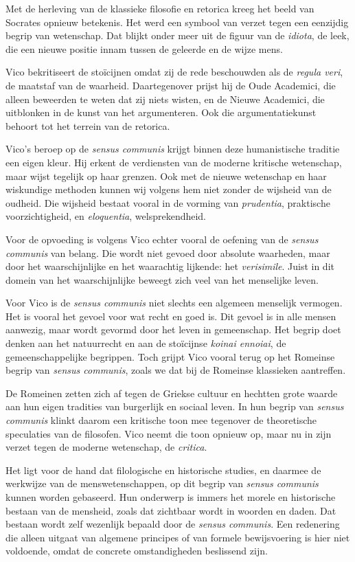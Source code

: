 Met de herleving van de klassieke filosofie en retorica kreeg het beeld van Socrates opnieuw betekenis. Het werd een symbool van verzet tegen een eenzijdig begrip van wetenschap. Dat blijkt onder meer uit de figuur van de \textit{idiota}, de leek, die een nieuwe positie innam tussen de geleerde en de wijze mens.

Vico bekritiseert de stoïcijnen omdat zij de rede beschouwden als de \textit{regula veri}, de maatstaf van de waarheid. Daartegenover prijst hij de Oude Academici, die alleen beweerden te weten dat zij niets wisten, en de Nieuwe Academici, die uitblonken in de kunst van het argumenteren. Ook die argumentatiekunst behoort tot het terrein van de retorica.

Vico's beroep op de \textit{sensus communis} krijgt binnen deze humanistische traditie een eigen kleur. Hij erkent de verdiensten van de moderne kritische wetenschap, maar wijst tegelijk op haar grenzen. Ook met de nieuwe wetenschap en haar wiskundige methoden kunnen wij volgens hem niet zonder de wijsheid van de oudheid. Die wijsheid bestaat vooral in de vorming van \textit{prudentia}, praktische voorzichtigheid, en \textit{eloquentia}, welsprekendheid.

Voor de opvoeding is volgens Vico echter vooral de oefening van de \textit{sensus communis} van belang. Die wordt niet gevoed door absolute waarheden, maar door het waarschijnlijke en het waarachtig lijkende: het \textit{verisimile}. Juist in dit domein van het waarschijnlijke beweegt zich veel van het menselijke leven.

Voor Vico is de \textit{sensus communis} niet slechts een algemeen menselijk vermogen. Het is vooral het gevoel voor wat recht en goed is. Dit gevoel is in alle mensen aanwezig, maar wordt gevormd door het leven in gemeenschap. Het begrip doet denken aan het natuurrecht en aan de stoïcijnse \textit{koinai ennoiai}, de gemeenschappelijke begrippen. Toch grijpt Vico vooral terug op het Romeinse begrip van \textit{sensus communis}, zoals we dat bij de Romeinse klassieken aantreffen.

De Romeinen zetten zich af tegen de Griekse cultuur en hechtten grote waarde aan hun eigen tradities van burgerlijk en sociaal leven. In hun begrip van \textit{sensus communis} klinkt daarom een kritische toon mee tegenover de theoretische speculaties van de filosofen. Vico neemt die toon opnieuw op, maar nu in zijn verzet tegen de moderne wetenschap, de \textit{critica}.

Het ligt voor de hand dat filologische en historische studies, en daarmee de werkwijze van de menswetenschappen, op dit begrip van \textit{sensus communis} kunnen worden gebaseerd. Hun onderwerp is immers het morele en historische bestaan van de mensheid, zoals dat zichtbaar wordt in woorden en daden. Dat bestaan wordt zelf wezenlijk bepaald door de \textit{sensus communis}. Een redenering die alleen uitgaat van algemene principes of van formele bewijsvoering is hier niet voldoende, omdat de concrete omstandigheden beslissend zijn.

